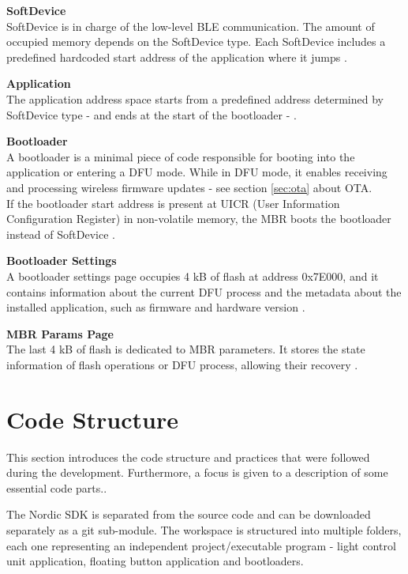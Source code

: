     \textbf{SoftDevice}\\
        SoftDevice is in charge of the low-level BLE communication. The amount of occupied memory depends on the SoftDevice type. Each SoftDevice includes a predefined hardcoded start address of the application where it jumps \cite{nrf52doc:softdevice}. 
        
    \textbf{Application}\\
        The application address space starts from a predefined address determined by SoftDevice type -  and ends at the start of the bootloader -   \cite{nrf52doc:bootloader}.
    
    \textbf{Bootloader}\\
        A bootloader is a minimal piece of code responsible for booting into the application or entering a DFU mode. While in DFU mode, it enables receiving and processing wireless firmware updates - see section \ref{sec:ota} about OTA.\\ 
        If the bootloader start address is present at UICR (User Information Configuration Register) in non-volatile memory, the MBR boots the bootloader instead of SoftDevice \cite{nrf52doc:bootloader}.
        
    \textbf{Bootloader Settings}\\
        A bootloader settings page occupies 4 kB of flash at address 0x7E000, and it contains information about the current DFU process and the metadata about the installed application, such as firmware and hardware version \cite{nrf52doc:bootloader}.
    
    \textbf{MBR Params Page}\\
        The last 4 kB of flash is dedicated to MBR parameters. It stores the state information of flash operations or DFU process, allowing their recovery \cite{nrf52doc:softdevice}. 

   
    
\section{Code Structure}
\label{sec:fw_code_structure}
    This section introduces the code structure and practices that were followed during the development. Furthermore, a focus is given to a description of some essential code parts..
    
    The Nordic SDK is separated from the source code and can be downloaded separately as a git sub-module. The workspace is structured into multiple folders, each one representing an independent project/executable program - light control unit application, floating button application and bootloaders. 
    
